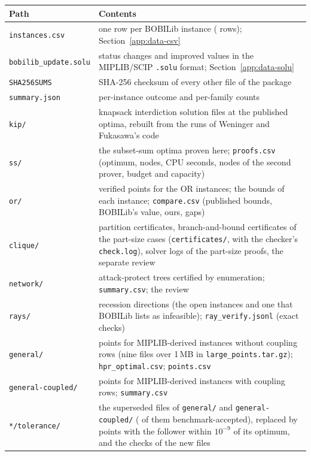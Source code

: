 \begin{center}
\small
\begin{tabular}{@{}p{1.5in}p{4.8in}@{}}
\toprule
Path & Contents\\
\midrule
\texttt{instances.csv} & one row per BOBILib instance (\NumInstances{} rows); Section~\ref{app:data-csv}\\
\texttt{bobilib\_update.solu} & status changes and improved values in the MIPLIB/SCIP \texttt{.solu} format; Section~\ref{app:data-solu}\\
\texttt{SHA256SUMS} & SHA-256 checksum of every other file of the package\\
\texttt{summary.json} & per-instance outcome and per-family counts\\
\texttt{kip/} & \NumKipFiles{} knapsack interdiction solution files at the published optima, rebuilt from the runs of Weninger and Fukasawa's code\cite{weninger_bkpsolver}\\
\texttt{ss/} & the \NumNewKip{} subset-sum optima proven here; \texttt{proofs.csv} (optimum, nodes, CPU seconds, nodes of the second prover, budget and capacity)\\
\texttt{or/} & \NumOrPoints{} verified points for the \NumOr{} OR instances; the bounds of each instance; \texttt{compare.csv} (published bounds, BOBILib's value, ours, gaps)\\
\texttt{clique/} & \NumCliqueSet{} partition certificates, branch-and-bound certificates of the \CliqueCertCases{} part-size cases (\texttt{certificates/}, with the checker's \texttt{check.log}), solver logs of the part-size proofs, the separate review\\
\texttt{network/} & \NumVerifyNetwork{} attack-protect trees certified by enumeration; \texttt{summary.csv}; the review\\
\texttt{rays/} & \NumRayFiles{} recession directions (the \NumNoFeasible{} open instances and one that BOBILib lists as infeasible); \texttt{ray\_verify.jsonl} (exact checks)\\
\texttt{general/} & \NumGeneralFiles{} points for MIPLIB-derived instances without coupling rows (nine files over 1\,MB in \texttt{large\_points.tar.gz}); \texttt{hpr\_optimal.csv}; \texttt{points.csv}\\
\texttt{general-coupled/} & \NumCoupledFiles{} points for MIPLIB-derived instances with coupling rows; \texttt{summary.csv}\\
\texttt{*/tolerance/} & the \NumTightSuperseded{} superseded files of \texttt{general/} and \texttt{general-coupled/} (\NumTightSupersededBench{} of them benchmark-accepted), replaced by points with the follower within $10^{-9}$ of its optimum, and the checks of the new files\\

\end{tabular}
\end{center}
